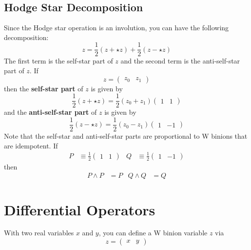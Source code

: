 \subsection{Hodge Star Decomposition}
Since the Hodge star operation is an involution, you can have the following decomposition:
\begin{equation}
    z = \frac{1}{2} \left( z + {\star z} \right) + \frac{1}{2} \left( z - {\star z} \right)
\end{equation}
The first term is the self-star part of $z$ and the second term is the anti-self-star part of $z$. If
\begin{equation}
    z = \begin{pmatrix}
        z_{0} & z_{1}
    \end{pmatrix}
\end{equation}
then the \textbf{self-star part} of $z$ is given by
\begin{equation}
    \frac{1}{2} \left( z + {\star z} \right) = \frac{1}{2} (z_{0} + z_{1}) \begin{pmatrix}
        1 & 1
    \end{pmatrix}
\end{equation}
and the \textbf{anti-self-star part} of $z$ is given by
\begin{equation}
    \frac{1}{2} \left( z - {\star z} \right) = \frac{1}{2} (z_{0} - z_{1}) \begin{pmatrix}
        1 & {-1}
    \end{pmatrix}
\end{equation}
Note that the self-star and anti-self-star parts are proportional to W binions that are idempotent. If
\begin{align}
    P &\equiv \frac{1}{2} \begin{pmatrix}
        1 & 1
    \end{pmatrix} & Q &\equiv \frac{1}{2} \begin{pmatrix}
        1 & {-1}
    \end{pmatrix}
\end{align}
then
\begin{align}
    P \wedge P &= P & Q \wedge Q &= Q
\end{align}
\section{Differential Operators}
With two real variables $x$ and $y$, you can define a W binion variable $z$ via
\begin{equation}
    z = \begin{pmatrix}
        x & y
    \end{pmatrix}
\end{equation}
